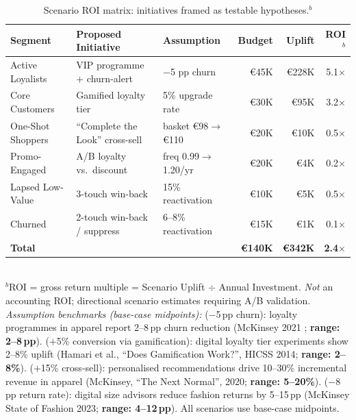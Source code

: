 \documentclass[10pt,a4paper]{article}
\newcommand{\eur}{€}
\begin{document}
\begin{table}[H]
\centering\small
\caption{Scenario ROI matrix: initiatives framed as testable hypotheses.$^{b}$}
\label{tab:roi}
\begin{tabular}{@{}p{2.8cm}p{3.4cm}p{2.6cm}rrr@{}}
\toprule
\textbf{Segment} & \textbf{Proposed Initiative} & \textbf{Assumption}
  & \textbf{Budget} & \textbf{Uplift} & \textbf{ROI$^{b}$} \\
\midrule
Active Loyalists  & VIP programme + churn-alert & $-$5 pp churn
  & \eur45K & \eur228K & 5.1$\times$ \\
Core Customers    & Gamified loyalty tier       & 5\% upgrade rate
  & \eur30K & \eur95K  & 3.2$\times$ \\
One-Shot Shoppers & ``Complete the Look'' cross-sell & basket \eur98$\to$\eur110
  & \eur20K & \eur10K  & 0.5$\times$ \\
Promo-Engaged     & A/B loyalty vs.\ discount   & freq 0.99$\to$1.20/yr
  & \eur20K & \eur4K   & 0.2$\times$ \\
Lapsed Low-Value  & 3-touch win-back            & 15\% reactivation
  & \eur10K & \eur5K   & 0.5$\times$ \\
Churned           & 2-touch win-back / suppress & 6--8\% reactivation
  & \eur15K & \eur1K   & 0.1$\times$ \\
\midrule
\textbf{Total}  &                             &
  & \textbf{\eur140K} & \textbf{\eur342K} & \textbf{2.4$\times$} \\
\bottomrule
\end{tabular}
\vspace{2pt}\\
{\footnotesize $^{b}$ROI = gross return multiple = Scenario Uplift $\div$ Annual Investment.
\textit{Not} an accounting ROI; directional scenario estimates requiring A/B validation.\\[2pt]
\textit{Assumption benchmarks (base-case midpoints):}
($-$5\,pp churn): loyalty programmes in apparel report 2--8\,pp churn reduction
(McKinsey 2021 \cite{mckinsey2021personalisation}; \textbf{range: 2--8\,pp}).
($+$5\% conversion via gamification): digital loyalty tier experiments show 2--8\% uplift
(Hamari et al., ``Does Gamification Work?'', HICSS 2014; \textbf{range: 2--8\%}).
($+$15\% cross-sell): personalised recommendations drive 10--30\% incremental revenue in
apparel (McKinsey, ``The Next Normal'', 2020; \textbf{range: 5--20\%}).
($-$8\,pp return rate): digital size advisors reduce fashion returns by 5--15\,pp
(McKinsey State of Fashion 2023; \textbf{range: 4--12\,pp}).
All scenarios use base-case midpoints.}
\end{table}
\end{document}
